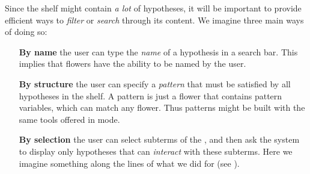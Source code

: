 \begin{scope}
Since the shelf might contain \emph{a lot} of hypotheses, it will be important
to provide efficient ways to \emph{filter} or \emph{search} through its content.
We imagine three main ways of doing so:
\begin{itemize}
  \item[\textbf{By name}] the user can type the \emph{name} of a hypothesis in a
  search bar. This implies that flowers have the ability to be named by the
  user.
  \item[\textbf{By structure}] the user can specify a \emph{pattern} that must
  be satisfied by all hypotheses in the shelf. A pattern is just a flower that
  contains pattern variables, which can match any flower. Thus patterns might be
  built with the same tools offered in \Edit mode.
  \item[\textbf{By selection}] the user can select subterms of the , and
  then ask the system to display only hypotheses that can \emph{interact} with
  these subterms. Here we imagine something along the lines of what we did for
   (see ).
\end{itemize}





\end{scope}
